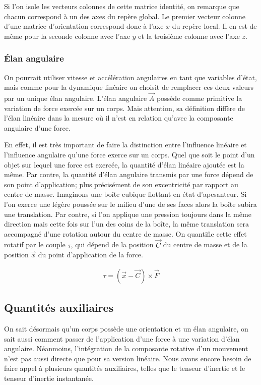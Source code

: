 Si l'on isole les vecteurs colonnes de cette matrice identité, on remarque que chacun correspond à un des axes du repère global. Le premier vecteur colonne d'une matrice d'orientation correspond donc à l'axe $x$ du repère local. Il en est de même pour la seconde colonne avec l'axe $y$ et la troisième colonne avec l'axe $z$.

\subsubsection{\'Elan angulaire}

On pourrait utiliser vitesse et accélération angulaires en tant que variables d'état, mais comme pour la dynamique linéaire on choisit de remplacer ces deux valeurs par un unique élan angulaire. L'élan angulaire $\vec A$ possède comme primitive la variation de force exercée sur un corps. Mais attention, sa définition diffère de l'élan linéaire dans la mesure o\`u il n'est en relation qu'avec la composante angulaire d'une force.

En effet, il est très important de faire la distinction entre l'influence linéaire et l'influence angulaire qu'une force exerce sur un corps. Quel que soit le point d'un objet sur lequel une force est exercée, la quantité d'élan linéaire ajoutée est la même. Par contre, la quantité d'élan angulaire transmis par une force dépend de son point d'application; plus précisément de son excentricité par rapport au centre de masse. Imaginons une boîte cubique flottant en état d'apesanteur. Si l'on exerce une légère poussée sur le milieu d'une de ses faces alors la boîte subira une translation. Par contre, si l'on applique une pression toujours dans la même direction mais cette fois sur l'un des coins de la boîte, la même translation sera accompagné d'une rotation autour du centre de masse. On quantifie cette effet rotatif par le couple $\tau$, qui dépend de la position $\vec C$ du centre de masse et de la position $\vec x$ du point d'application de la force.

\begin{align}
  \tau = (\vec{x} - \vec{C}) \times \vec{F}
\end{align}

\subsection{Quantités auxiliaires}

On sait désormais qu'un corps possède une orientation et un élan angulaire, on sait aussi comment passer de l'application d'une force à une variation d'élan angulaire. Néanmoins, l'intégration de la composante rotative d'un mouvement n'est pas aussi directe que pour sa version linéaire. Nous avons encore besoin de faire appel à plusieurs quantités auxiliaires, telles que le tenseur d'inertie et le tenseur d'inertie instantanée.

